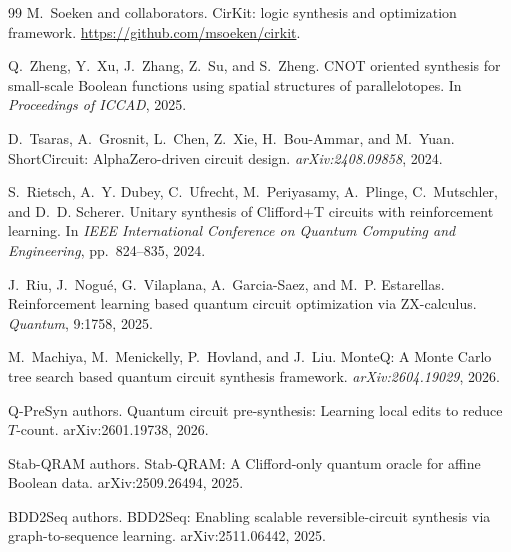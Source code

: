 \documentclass[UTF8,fontset=fandol,11pt]{ctexart}
\begin{document}
\begin{thebibliography}{99}
M.~Soeken and collaborators.
\newblock CirKit: logic synthesis and optimization framework.
\newblock \url{https://github.com/msoeken/cirkit}.

Q.~Zheng, Y.~Xu, J.~Zhang, Z.~Su, and S.~Zheng.
\newblock CNOT oriented synthesis for small-scale Boolean functions using spatial structures of parallelotopes.
\newblock In \emph{Proceedings of ICCAD}, 2025.

D.~Tsaras, A.~Grosnit, L.~Chen, Z.~Xie, H.~Bou-Ammar, and M.~Yuan.
\newblock ShortCircuit: AlphaZero-driven circuit design.
\newblock \emph{arXiv:2408.09858}, 2024.

S.~Rietsch, A.~Y. Dubey, C.~Ufrecht, M.~Periyasamy, A.~Plinge, C.~Mutschler, and D.~D. Scherer.
\newblock Unitary synthesis of Clifford+T circuits with reinforcement learning.
\newblock In \emph{IEEE International Conference on Quantum Computing and Engineering}, pp.~824--835, 2024.

J.~Riu, J.~Nogu{\'e}, G.~Vilaplana, A.~Garcia-Saez, and M.~P. Estarellas.
\newblock Reinforcement learning based quantum circuit optimization via ZX-calculus.
\newblock \emph{Quantum}, 9:1758, 2025.

M.~Machiya, M.~Menickelly, P.~Hovland, and J.~Liu.
\newblock MonteQ: A Monte Carlo tree search based quantum circuit synthesis framework.
\newblock \emph{arXiv:2604.19029}, 2026.

Q-PreSyn authors.
\newblock Quantum circuit pre-synthesis: Learning local edits to reduce $T$-count.
\newblock arXiv:2601.19738, 2026.

Stab-QRAM authors.
\newblock Stab-QRAM: A Clifford-only quantum oracle for affine Boolean data.
\newblock arXiv:2509.26494, 2025.

BDD2Seq authors.
\newblock BDD2Seq: Enabling scalable reversible-circuit synthesis via graph-to-sequence learning.
\newblock arXiv:2511.06442, 2025.

\end{thebibliography}
\end{document}
